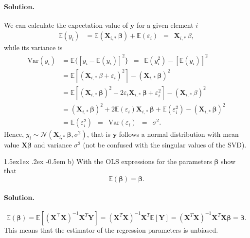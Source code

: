 \documentclass[%
oneside,                 %
final,                   %
10pt]{article}
\makeatletter
\newenvironment{doconceexercise}{}{}
\newcommand\subex{\@startsection{paragraph}{4}{\z@}%
                  {1.5ex\@plus1ex \@minus.2ex}%
                  {-0.5em}%
                  {\normalfont\normalsize\bfseries}}
\makeatother
\begin{document}
\begin{doconceexercise}
\paragraph{Solution.}
We can calculate the expectation value of $\bm{y}$ for a given element $i$ 
\begin{align*} 
\mathbb{E}(y_i) & =
\mathbb{E}(\mathbf{X}_{i, \ast} \, \bm{\beta}) + \mathbb{E}(\varepsilon_i)
\, \, \, = \, \, \, \mathbf{X}_{i, \ast} \, \beta, 
\end{align*} 
while
its variance is 
\begin{align*} \mbox{Var}(y_i) & = \mathbb{E} \{ [y_i
- \mathbb{E}(y_i)]^2 \} \, \, \, = \, \, \, \mathbb{E} ( y_i^2 ) -
[\mathbb{E}(y_i)]^2  \\  & = \mathbb{E} [ ( \mathbf{X}_{i, \ast} \,
\beta + \varepsilon_i )^2] - ( \mathbf{X}_{i, \ast} \, \bm{\beta})^2 \\ &
= \mathbb{E} [ ( \mathbf{X}_{i, \ast} \, \bm{\beta})^2 + 2 \varepsilon_i
\mathbf{X}_{i, \ast} \, \bm{\beta} + \varepsilon_i^2 ] - ( \mathbf{X}_{i,
\ast} \, \beta)^2 \\  & = ( \mathbf{X}_{i, \ast} \, \bm{\beta})^2 + 2
\mathbb{E}(\varepsilon_i) \mathbf{X}_{i, \ast} \, \bm{\beta} +
\mathbb{E}(\varepsilon_i^2 ) - ( \mathbf{X}_{i, \ast} \, \bm{\beta})^2 
\\ & = \mathbb{E}(\varepsilon_i^2 ) \, \, \, = \, \, \,
\mbox{Var}(\varepsilon_i) \, \, \, = \, \, \, \sigma^2.  
\end{align*}
Hence, $y_i \sim \mathcal{N}( \mathbf{X}_{i, \ast} \, \bm{\beta}, \sigma^2)$, that is $\bm{y}$ follows a normal distribution with 
mean value $\bm{X}\bm{\beta}$ and variance $\sigma^2$ (not be confused with the singular values of the SVD).


\subex{b)}
With the OLS expressions for the parameters $\bm{\beta}$ show that
\[
\mathbb{E}(\bm{\beta}) = \bm{\beta}.
\]


\paragraph{Solution.}
\[
\mathbb{E}(\bm{\beta}) = \mathbb{E}[ (\mathbf{X}^{\top} \mathbf{X})^{-1}\mathbf{X}^{T} \mathbf{Y}]=(\mathbf{X}^{T} \mathbf{X})^{-1}\mathbf{X}^{T} \mathbb{E}[ \mathbf{Y}]=(\mathbf{X}^{T} \mathbf{X})^{-1} \mathbf{X}^{T}\mathbf{X}\bm{\beta}=\bm{\beta}.
\]
This means that the estimator of the regression parameters is unbiased.


\end{doconceexercise}
\end{document}
